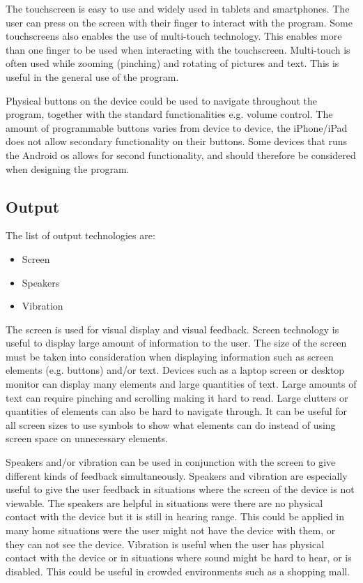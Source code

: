 The touchscreen is easy to use and widely used in tablets and smartphones. The user can press on the screen with their finger to interact with the program. Some touchscreens also enables the use of multi-touch technology. This enables more than one finger to be used when interacting with the touchscreen. Multi-touch is often used while zooming (pinching) and rotating of pictures and text. This is useful in the general use of the program.
%

Physical buttons on the device could be used to navigate throughout the program, together with the standard functionalities e.g. volume control. The amount of programmable buttons varies from device to device, the iPhone/iPad does not allow secondary functionality on their buttons. Some devices that runs the Android os allows for second functionality\cite{android_Rebind}, and should therefore be considered when designing the program.

\subsection{Output}
The list of output technologies are:

\begin{itemize}
    \item Screen
    \item Speakers
    \item Vibration
\end{itemize}

The screen is used for visual display and visual feedback. Screen technology is useful to display large amount of information to the user.
The size of the screen must be taken into consideration when displaying information such as screen elements (e.g. buttons) and/or text.
Devices such as a laptop screen or desktop monitor can display many elements and large quantities of text.
Large amounts of text can require pinching and scrolling making it hard to read. Large clutters or quantities of elements can also be hard to navigate through.
It can be useful for all screen sizes to use symbols to show what elements can do instead of using screen space on unnecessary elements.

Speakers and/or vibration can be used in conjunction with the screen to give different kinds of feedback simultaneously.
Speakers and vibration are especially useful to give the user feedback in situations where the screen of the device is not viewable.
The speakers are helpful in situations were there are no physical contact with the device but it is still in hearing range.
This could be applied in many home situations were the user might not have the device with them, or they can not see the device.
Vibration is useful when the user has physical contact with the device or in situations where sound might be hard to hear, or is disabled.
This could be useful in crowded environments such as a shopping mall.     

